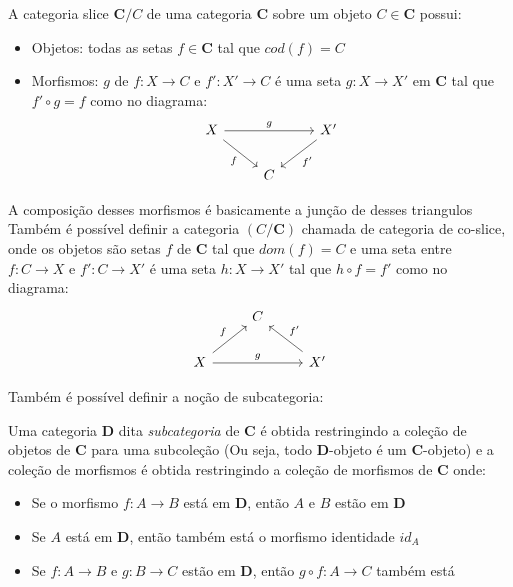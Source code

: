 \documentclass[../main.tex]{subfiles}
\begin{document}
\begin{definition}
    A categoria slice $\textbf{C}/C$ de uma categoria $\textbf{C}$ sobre um objeto $C \in \textbf{C}$ possui:
    \begin{itemize}
        \item Objetos: todas as setas $f \in \textbf{C}$ tal que $cod(f) = C$
        \item Morfismos: $g$ de $f : X \to C$ e $f' : X' \to C$ é uma seta $g : X \to X'$ em $\textbf{C}$ tal que $f' \circ g = f$ como no diagrama:
        \[\begin{tikzcd}
            X && {X'} \\
            & C
            \arrow["g", from=1-1, to=1-3]
            \arrow["f"', from=1-1, to=2-2]
            \arrow["{f'}", from=1-3, to=2-2]
        \end{tikzcd}\]
    \end{itemize}
    A composição desses morfismos é basicamente a junção de desses triangulos \\

    Também é possível definir a categoria $(C / \textbf{C})$ chamada de categoria de co-slice, onde os objetos são setas $f$ de $\textbf{C}$ tal que $dom(f) = C$ e uma seta entre $f : C \to X$ e $f' : C \to X'$ é uma seta $h : X \to X'$ tal que $h \circ f = f'$ como no diagrama:
    \[\begin{tikzcd}
        & C \\
        X && {X'}
        \arrow["f", from=2-1, to=1-2]
        \arrow["g", from=2-1, to=2-3]
        \arrow["{f'}"', from=2-3, to=1-2]
    \end{tikzcd}\]
\end{definition}

Também é possível definir a noção de subcategoria:

\begin{definition}
    Uma categoria $\textbf{D}$ dita \emph{subcategoria} de $\textbf{C}$ é obtida restringindo a coleção de objetos de $\textbf{C}$ para uma subcoleção (Ou seja, todo $\textbf{D}$-objeto é um $\textbf{C}$-objeto) e a coleção de morfismos é obtida restringindo a coleção de morfismos de $\textbf{C}$ onde:
    \begin{itemize}
        \item Se o morfismo $f : A \to B$ está em $\textbf{D}$, então $A$ e $B$ estão em $\textbf{D}$
        \item Se $A$ está em $\textbf{D}$, então também está o morfismo identidade $id_A$
        \item Se $f : A \to B$ e $g : B \to C$ estão em $\textbf{D}$, então $g \circ f : A \to C$ também está
    \end{itemize}
\end{definition}
\end{document}
